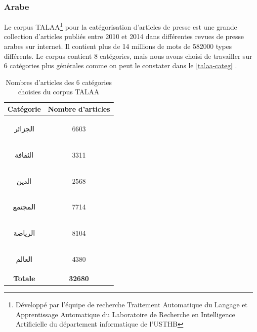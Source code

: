    \subsubsection{Arabe}
    Le corpus TALAA\footnote{Développé par l'équipe de recherche Traitement Automatique du Langage et Apprentissage Automatique du Laboratoire de Recherche en Intelligence Artificielle du département informatique de l'USTHB} pour la catégorisation d'articles de presse est une grande collection d'articles publiés entre 2010 et 2014 dans différentes revues de presse arabes sur internet. Il contient plus de 14 millions de mots de 582000 types différents. Le corpus contient 8 catégories, mais nous avons choisi de travailler sur 6 catégories plus générales comme on peut le constater dans le \autoref{talaa-categ} \cite{asma-sellab}. 
    \begin{table}[H]
        \begin{center}
            \begin{tabular}{|c|c|}
                \hline
                \textbf{Catégorie} &  \textbf{Nombre d'articles} \\
                \hline
                \begin{arab}الجزائر\end{arab} & 6603 \\
                \begin{arab}الثقافة\end{arab} & 3311 \\
                \begin{arab}الدين\end{arab} & 2568 \\
                \begin{arab}المجتمع\end{arab} & 7714 \\
                \begin{arab}الرياضة\end{arab} & 8104 \\
                \begin{arab}العالم\end{arab} & 4380 \\
                \textbf{Totale} & \textbf{32680} \\
                \hline
            \end{tabular}
        \end{center}
        \caption{Nombres d'articles des 6 catégories choisies du corpus \textquotedbl TALAA\textquotedbl}
        \label{talaa-categ}
    \end{table}

